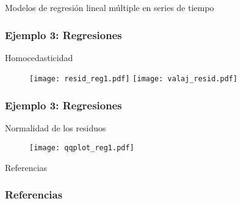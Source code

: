 \documentclass[xcolor=(list of options)]{beamer}
\begin{document}
\begin{section}{Modelos de regresi\'on lineal m\'ultiple en series de tiempo}
\begin{frame}
\frametitle{Ejemplo 3: Regresiones}

Homocedasticidad

\begin{figure}[t!]
\texttt{[image: resid\_reg1.pdf]}
\texttt{[image: valaj\_resid.pdf]}
\end{figure}

\end{frame}

\begin{frame}
\frametitle{Ejemplo 3: Regresiones}

Normalidad de los residuos

\begin{figure}[t!]
\texttt{[image: qqplot\_reg1.pdf]}
\end{figure}

\end{frame}
\end{section}


\begin{section}{Referencias}
\begin{frame}[allowframebreaks]
        \frametitle{Referencias}
        
        \nocite{*} %
        
\end{frame}
\end{section}

\end{document}
